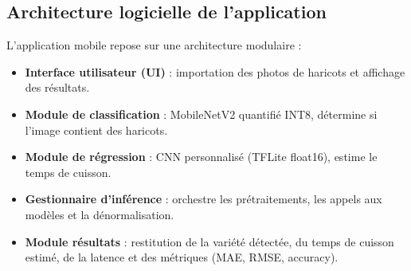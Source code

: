 \subsection{Architecture logicielle de l’application}
L’application mobile repose sur une architecture modulaire :
\begin{itemize}
    \item \textbf{Interface utilisateur (UI)} : importation des photos de haricots et affichage des résultats.
    \item \textbf{Module de classification} : MobileNetV2 quantifié INT8, détermine si l’image contient des haricots.
    \item \textbf{Module de régression} : CNN personnalisé (TFLite float16), estime le temps de cuisson.
    \item \textbf{Gestionnaire d’inférence} : orchestre les prétraitements, les appels aux modèles et la dénormalisation.
    \item \textbf{Module résultats} : restitution de la variété détectée, du temps de cuisson estimé, de la latence et des métriques (MAE, RMSE, accuracy).
\end{itemize}

